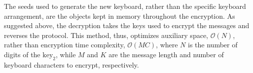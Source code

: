\documentclass{article}
\begin{document}
The seeds used to generate the new keyboard, rather than the specific keyboard arrangement, are the objects kept in memory throughout the encryption. 
As suggested above, the decryption takes the keys used to encrypt the messages and reverses the protocol. 
This method, thus, optimizes auxiliary space, $\mathcal{O}(N)$, rather than encryption time complexity, $\mathcal{O}(MC)$, 
where $N$ is the number of digits of the $\mathrm{key_2}$, while $M$ and $K$ are the message 
length and number of keyboard characters to encrypt, respectively.
\end{document}
